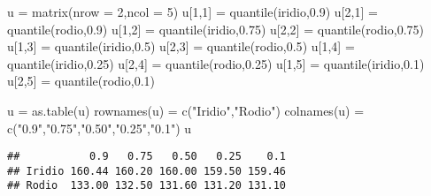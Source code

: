 \documentclass[
]{article}
\newenvironment{Shaded}{\begin{snugshade}}{\end{snugshade}}
\newcommand{\AttributeTok}[1]{\textcolor[rgb]{0.77,0.63,0.00}{#1}}
\newcommand{\DecValTok}[1]{\textcolor[rgb]{0.00,0.00,0.81}{#1}}
\newcommand{\FloatTok}[1]{\textcolor[rgb]{0.00,0.00,0.81}{#1}}
\newcommand{\FunctionTok}[1]{\textcolor[rgb]{0.00,0.00,0.00}{#1}}
\newcommand{\NormalTok}[1]{#1}
\newcommand{\OtherTok}[1]{\textcolor[rgb]{0.56,0.35,0.01}{#1}}
\newcommand{\StringTok}[1]{\textcolor[rgb]{0.31,0.60,0.02}{#1}}
\begin{document}
\begin{Shaded}
\begin{Highlighting}[]
\NormalTok{u }\OtherTok{=} \FunctionTok{matrix}\NormalTok{(}\AttributeTok{nrow =} \DecValTok{2}\NormalTok{,}\AttributeTok{ncol =} \DecValTok{5}\NormalTok{)}
\NormalTok{u[}\DecValTok{1}\NormalTok{,}\DecValTok{1}\NormalTok{] }\OtherTok{=} \FunctionTok{quantile}\NormalTok{(iridio,}\FloatTok{0.9}\NormalTok{)}
\NormalTok{u[}\DecValTok{2}\NormalTok{,}\DecValTok{1}\NormalTok{] }\OtherTok{=} \FunctionTok{quantile}\NormalTok{(rodio,}\FloatTok{0.9}\NormalTok{)}
\NormalTok{u[}\DecValTok{1}\NormalTok{,}\DecValTok{2}\NormalTok{] }\OtherTok{=} \FunctionTok{quantile}\NormalTok{(iridio,}\FloatTok{0.75}\NormalTok{)}
\NormalTok{u[}\DecValTok{2}\NormalTok{,}\DecValTok{2}\NormalTok{] }\OtherTok{=} \FunctionTok{quantile}\NormalTok{(rodio,}\FloatTok{0.75}\NormalTok{)}
\NormalTok{u[}\DecValTok{1}\NormalTok{,}\DecValTok{3}\NormalTok{] }\OtherTok{=} \FunctionTok{quantile}\NormalTok{(iridio,}\FloatTok{0.5}\NormalTok{)}
\NormalTok{u[}\DecValTok{2}\NormalTok{,}\DecValTok{3}\NormalTok{] }\OtherTok{=} \FunctionTok{quantile}\NormalTok{(rodio,}\FloatTok{0.5}\NormalTok{)}
\NormalTok{u[}\DecValTok{1}\NormalTok{,}\DecValTok{4}\NormalTok{] }\OtherTok{=} \FunctionTok{quantile}\NormalTok{(iridio,}\FloatTok{0.25}\NormalTok{)}
\NormalTok{u[}\DecValTok{2}\NormalTok{,}\DecValTok{4}\NormalTok{] }\OtherTok{=} \FunctionTok{quantile}\NormalTok{(rodio,}\FloatTok{0.25}\NormalTok{)}
\NormalTok{u[}\DecValTok{1}\NormalTok{,}\DecValTok{5}\NormalTok{] }\OtherTok{=} \FunctionTok{quantile}\NormalTok{(iridio,}\FloatTok{0.1}\NormalTok{)}
\NormalTok{u[}\DecValTok{2}\NormalTok{,}\DecValTok{5}\NormalTok{] }\OtherTok{=} \FunctionTok{quantile}\NormalTok{(rodio,}\FloatTok{0.1}\NormalTok{)}

\NormalTok{u }\OtherTok{=} \FunctionTok{as.table}\NormalTok{(u)}
\FunctionTok{rownames}\NormalTok{(u) }\OtherTok{=} \FunctionTok{c}\NormalTok{(}\StringTok{"Iridio"}\NormalTok{,}\StringTok{"Rodio"}\NormalTok{)}
\FunctionTok{colnames}\NormalTok{(u) }\OtherTok{=} \FunctionTok{c}\NormalTok{(}\StringTok{"0.9"}\NormalTok{,}\StringTok{"0.75"}\NormalTok{,}\StringTok{"0.50"}\NormalTok{,}\StringTok{"0.25"}\NormalTok{,}\StringTok{"0.1"}\NormalTok{)}
\NormalTok{u}
\end{Highlighting}
\end{Shaded}

\begin{verbatim}
##           0.9   0.75   0.50   0.25    0.1
## Iridio 160.44 160.20 160.00 159.50 159.46
## Rodio  133.00 132.50 131.60 131.20 131.10
\end{verbatim}
\end{document}
